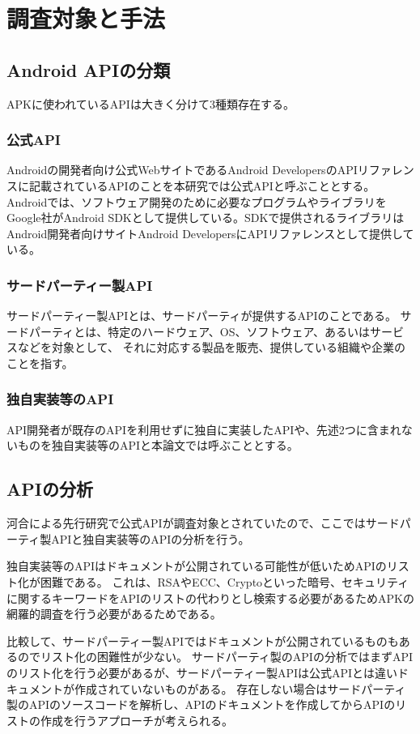 \newpage
\section{調査対象と手法}

\subsection{Android APIの分類}
\label{sec:APIの分類}
APKに使われているAPIは大きく分けて3種類存在する。
\subsubsection {公式API}
Androidの開発者向け公式WebサイトであるAndroid DevelopersのAPIリファレンスに記載されているAPIのことを本研究では公式APIと呼ぶこととする。
Androidでは、ソフトウェア開発のために必要なプログラムやライブラリをGoogle社がAndroid SDKとして提供している。SDKで提供されるライブラリはAndroid開発者向けサイトAndroid DevelopersにAPIリファレンスとして提供している。

\subsubsection {サードパーティー製API}
サードパーティー製APIとは、サードパーティが提供するAPIのことである。
サードパーティとは、特定のハードウェア、OS、ソフトウェア、あるいはサービスなどを対象として、
それに対応する製品を販売、提供している組織や企業のことを指す。

\subsubsection {独自実装等のAPI}
API開発者が既存のAPIを利用せずに独自に実装したAPIや、先述2つに含まれないものを独自実装等のAPIと本論文では呼ぶこととする。
\subsection{APIの分析}
河合による先行研究で公式APIが調査対象とされていたので、ここではサードパーティ製APIと独自実装等のAPIの分析を行う。
\label{sec:APIの分析}

独自実装等のAPIはドキュメントが公開されている可能性が低いためAPIのリスト化が困難である。
これは、RSAやECC、Cryptoといった暗号、セキュリティ
に関するキーワードをAPIのリストの代わりとし検索する必要があるためAPKの網羅的調査を行う必要があるためである。

比較して、サードパーティー製APIではドキュメントが公開されているものもあるのでリスト化の困難性が少ない。
サードパーティ製のAPIの分析ではまずAPIのリスト化を行う必要があるが、サードパーティー製APIは公式APIとは違いドキュメントが作成されていないものがある。
存在しない場合はサードパーティ製のAPIのソースコードを解析し、APIのドキュメントを作成してからAPIのリストの作成を行うアプローチが考えられる。

